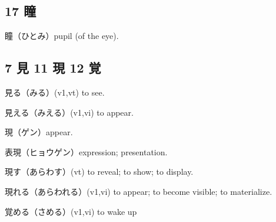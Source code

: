 \subsection{17 瞳}

瞳（ひとみ）pupil (of the eye).

\subsection{7 見 11 現 12 覚}

見る（みる）(v1,vt) to see.

見える（みえる）(v1,vi) to appear.

現（ゲン）appear.

表現（ヒョウゲン）expression; presentation.

現す（あらわす）(vt) to reveal; to show; to display.

現れる（あらわれる）(v1,vi) to appear; to become visible; to materialize.

覚める（さめる）(v1,vi) to wake up
